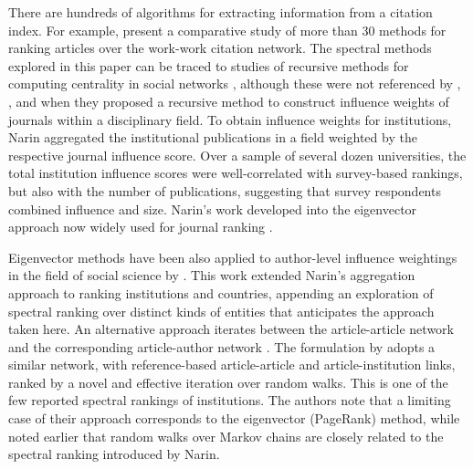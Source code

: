 There are hundreds of algorithms for extracting information from a citation index. For example, \cite {kanellosImpactbasedRankingScientific2019} present a comparative study of more than 30 methods for ranking articles over the work-work citation network. The spectral methods explored in this paper can be traced to studies of recursive methods for computing centrality in social networks \citep{vigna}, although these were 
not referenced by \cite{narinEvaluativeBibliometricsUse1976}, \cite{pinskiCitationInfluenceJournal1976}, and \cite{narinStructureBiomedicalLiterature1976} when they proposed a recursive method to construct influence weights of journals within a disciplinary field. To obtain influence weights for institutions, Narin aggregated the institutional publications in a field weighted by the respective journal influence score. Over a sample of several dozen universities, the total institution influence scores were well-correlated with survey-based rankings, but also with the number of publications, suggesting that survey respondents combined influence and size. Narin's work developed into the eigenvector approach now widely used for journal ranking \citep{bollenJournalStatus2006, bergstromEigenfactorMetricsFigure2008, franceschetTenGoodReasons2010, vignaSpectralRanking2016}. 

Eigenvector methods have been also applied to author-level influence weightings in the field of social science by \cite{westAuthorlevelEigenfactorMetrics2013}. This work extended Narin's aggregation approach to ranking institutions and countries, appending an exploration of spectral ranking over distinct kinds of entities that anticipates the approach taken here. An alternative approach iterates between the article-article network and the corresponding article-author network \citep{ujumBestBothWorlds2015, palCITEXNewCitation2015}. The formulation by \cite{caoRankingAcademicInstitutions2023} adopts a similar network, with reference-based article-article and article-institution links, ranked by a novel and effective iteration over random walks. This is one of the few reported spectral rankings of institutions. The authors note that a limiting case of their approach corresponds to the eigenvector (PageRank) method, while \cite{gellerCitationInfluenceMethodology1978} noted earlier that random walks over Markov chains are closely related to the spectral ranking introduced by Narin. 

